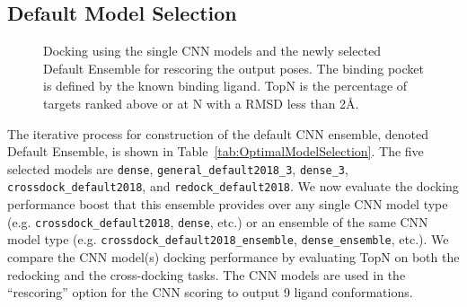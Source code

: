 \documentclass[linenumbers,doublespacing]{bmcart}
\begin{document}
\subsection{Default Model Selection}
\begin{figure}[tb]
	\caption{Docking using the single CNN models and the newly selected Default Ensemble for rescoring the output poses. The binding pocket is defined by the known binding ligand. TopN is the percentage of targets ranked above or at N with a RMSD less than 2{\AA}.}
	\label{fig:RescoreSingle}
\end{figure}

The iterative process for construction of the default CNN ensemble, denoted Default Ensemble, is shown in Table~\ref{tab:OptimalModelSelection}. The five selected models are \texttt{dense}, \texttt{general\_default2018\_3}, \texttt{dense\_3}, \texttt{crossdock\_default2018}, and \texttt{redock\_default2018}. We now evaluate the docking performance boost that this ensemble provides over any single CNN model type (e.g. \texttt{crossdock\_default2018}, \texttt{dense}, etc.) or an ensemble of the same CNN model type (e.g. \texttt{crossdock\_default2018\_ensemble}, \texttt{dense\_ensemble}, etc.). We compare the CNN model(s) docking performance by evaluating TopN on both the redocking and the cross-docking tasks. The CNN models are used in the ``rescoring'' option for the CNN scoring to output 9 ligand conformations. 
\end{document}

